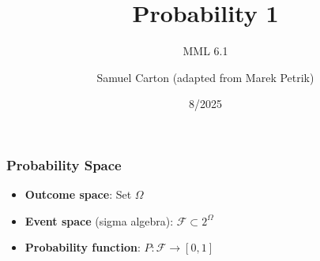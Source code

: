 \documentclass{beamer}
\title{Probability 1}
\subtitle{MML 6.1}
\author{Samuel Carton (adapted from Marek Petrik)}
\date{8/2025}
\begin{document}
\begin{frame}
\maketitle
\end{frame}


\begin{frame} \frametitle{Probability Space}
\begin{itemize}
\item \textbf{Outcome space}: Set $\Omega$
  \vfill 
\item \textbf{Event space} (sigma algebra): $\mathcal{F} \subset 2^{\Omega}$
  \vfill
\item \textbf{Probability function}: $P \colon \mathcal{F} \to [0,1]$
\end{itemize}
\end{frame}
\end{document}
